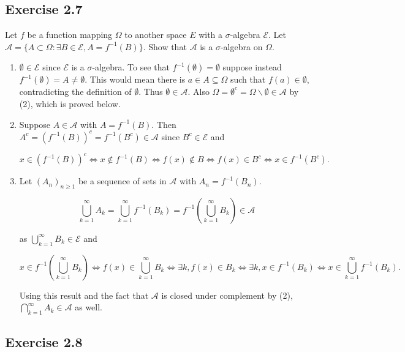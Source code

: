 \documentclass{article}
\begin{document}
\subsection*{Exercise 2.7}

Let $f$ be a function mapping $\Omega$ to another space $E$ with a $\sigma$-algebra $\mathcal{E}$.
Let $\mathcal{A} = \{A \subset \Omega : \exists B \in \mathcal{E}, A = f^{-1}(B)\}$. Show that $\mathcal{A}$ is a
$\sigma$-algebra on $\Omega$. 

\begin{enumerate}

\item $\emptyset \in \mathcal{E}$ since $\mathcal{E}$ is a $\sigma$-algebra. To see that $f^{-1}(\emptyset) = \emptyset$ suppose instead $f^{-1}(\emptyset) = A \neq \emptyset$. This would mean there is $a \in A\subseteq \Omega$ such that $f(a) \in \emptyset$, contradicting the definition of $\emptyset$. Thus $\emptyset \in \mathcal{A}$. Also $\Omega = \emptyset^c = \Omega \backslash \emptyset \in \mathcal{A}$ by (2), which is proved below. 

\item Suppose $A \in \mathcal{A}$ with $A = f^{-1}(B)$. Then $A^c = (f^{-1}(B))^c = f^{-1}(B^c) \in \mathcal{A}$ since $B^c \in \mathcal{E}$ and 

$$
x \in (f^{-1}(B))^c \iff x \notin f^{-1}(B) \iff f(x) \notin B \iff f(x) \in B^c \iff x \in f^{-1}(B^c).
$$


\item Let $(A_n)_{n\geq 1}$ be a sequence of sets in $\mathcal{A}$ with $A_n = f^{-1}(B_n)$.

$$\bigcup_{k=1}^\infty A_k = \bigcup_{k=1}^\infty f^{-1}(B_k) = f^{-1}\left(\bigcup_{k=1}^\infty  B_k \right) \in \mathcal{A}
$$

as $\bigcup_{k=1}^\infty B_k \in \mathcal{E}$ and 

$$x \in f^{-1}\left(\bigcup_{k=1}^\infty  B_k \right)
\iff f(x) \in \bigcup_{k=1}^\infty  B_k
\iff \exists k, f(x) \in B_k
\iff \exists k, x \in f^{-1}(B_k)
\iff x \in \bigcup_{k=1}^\infty  f^{-1}(B_k).
$$

Using this result and the fact that $\mathcal{A}$ is closed under complement by (2), $\bigcap_{k=1}^\infty A_k \in \mathcal{A}$ as well. 
\end{enumerate}

\subsection*{Exercise 2.8}\
\end{document}
